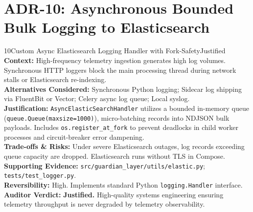 \documentclass[10pt,a4paper]{report}
\begin{document}
\section{ADR-10: Asynchronous Bounded Bulk Logging to Elasticsearch}
\begin{adrbox}{10}{Custom Async Elasticsearch Logging Handler with Fork-Safety}{Justified}
\textbf{Context:} High-frequency telemetry ingestion generates high log volumes. Synchronous HTTP loggers block the main processing thread during network stalls or Elasticsearch re-indexing.\\
\textbf{Alternatives Considered:} Synchronous Python logging; Sidecar log shipping via FluentBit or Vector; Celery async log queue; Local syslog.\\
\textbf{Justification:} \texttt{AsyncElasticSearchHandler} utilizes a bounded in-memory queue (\texttt{queue.Queue(maxsize=1000)}), micro-batching records into NDJSON bulk payloads. Includes \texttt{os.register\_at\_fork} to prevent deadlocks in child worker processes and circuit-breaker error dampening.\\
\textbf{Trade-offs \& Risks:} Under severe Elasticsearch outages, log records exceeding queue capacity are dropped. Elasticsearch runs without TLS in Compose.\\
\textbf{Supporting Evidence:} \texttt{src/guardian\_layer/utils/elastic.py}; \texttt{tests/test\_logger.py}.\\
\textbf{Reversibility:} High. Implements standard Python \texttt{logging.Handler} interface.\\
\textbf{Auditor Verdict:} \textbf{Justified.} High-quality systems engineering ensuring telemetry throughput is never degraded by telemetry observability.
\end{adrbox}
\end{document}
